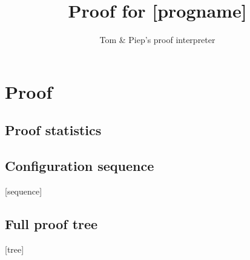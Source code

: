 \documentclass{article}
\begin{document}
\title{Proof for [progname]}
\author{Tom \& Piep's proof interpreter}

\maketitle

\section{Proof}
\subsection{Proof statistics}

\begin{landscape}
\subsection{Configuration sequence}
[sequence]

\subsection{Full proof tree}
\scriptsize{
[tree]
}
\end{landscape}
\end{document}
